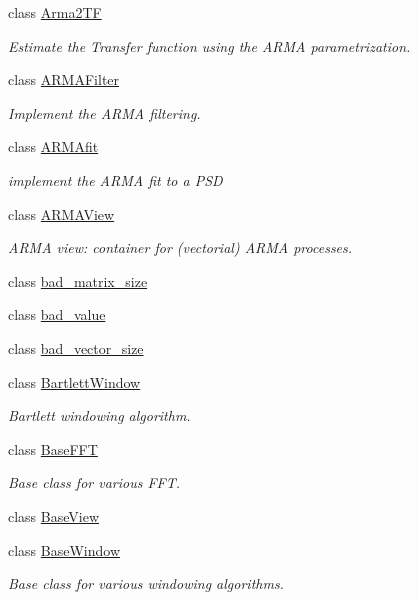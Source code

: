 \begin{DoxyCompactItemize}
class \hyperlink{classtsa_1_1_arma2_t_f}{Arma2\+TF}
\begin{DoxyCompactList}\small\item\em Estimate the Transfer function using the A\+R\+MA parametrization. \end{DoxyCompactList}\item 
class \hyperlink{classtsa_1_1_a_r_m_a_filter}{A\+R\+M\+A\+Filter}
\begin{DoxyCompactList}\small\item\em Implement the A\+R\+MA filtering. \end{DoxyCompactList}\item 
class \hyperlink{classtsa_1_1_a_r_m_afit}{A\+R\+M\+Afit}
\begin{DoxyCompactList}\small\item\em implement the A\+R\+MA fit to a P\+SD \end{DoxyCompactList}\item 
class \hyperlink{classtsa_1_1_a_r_m_a_view}{A\+R\+M\+A\+View}
\begin{DoxyCompactList}\small\item\em A\+R\+MA view\+: container for (vectorial) A\+R\+MA processes. \end{DoxyCompactList}\item 
class \hyperlink{classtsa_1_1bad__matrix__size}{bad\+\_\+matrix\+\_\+size}
\item 
class \hyperlink{classtsa_1_1bad__value}{bad\+\_\+value}
\item 
class \hyperlink{classtsa_1_1bad__vector__size}{bad\+\_\+vector\+\_\+size}
\item 
class \hyperlink{classtsa_1_1_bartlett_window}{Bartlett\+Window}
\begin{DoxyCompactList}\small\item\em Bartlett windowing algorithm. \end{DoxyCompactList}\item 
class \hyperlink{classtsa_1_1_base_f_f_t}{Base\+F\+FT}
\begin{DoxyCompactList}\small\item\em Base class for various F\+FT. \end{DoxyCompactList}\item 
class \hyperlink{classtsa_1_1_base_view}{Base\+View}
\item 
class \hyperlink{classtsa_1_1_base_window}{Base\+Window}
\begin{DoxyCompactList}\small\item\em Base class for various windowing algorithms. \end{DoxyCompactList}\item 

\end{DoxyCompactItemize}
